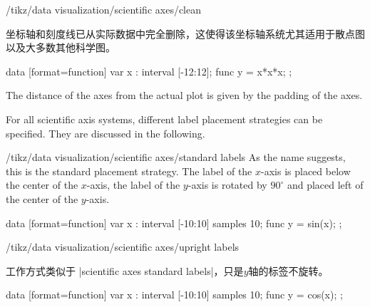 \begin{key}{/tikz/data visualization/scientific axes/clean}

    坐标轴和刻度线已从实际数据中完全删除，这使得该坐标轴系统尤其适用于散点图以及大多数其他科学图。
\begin{codeexample}[
    width=7.5cm,
    preamble={\usetikzlibrary{datavisualization.formats.functions}},
]
\tikz \datavisualization [
  scientific axes=clean,
  visualize as smooth line]
data [format=function] {
  var x : interval [-12:12];
  func y = \value x*\value x*\value x;
};
\end{codeexample}

    The distance of the axes from the actual plot is given by the padding of the axes.
\end{key}

For all scientific axis systems, different label placement strategies can be specified. They are discussed in the following.

\begin{key}{/tikz/data visualization/scientific axes/standard labels}
    As the name suggests, this is the standard placement strategy. The label of the $x$-axis is placed below the center of the $x$-axis, the label of the $y$-axis is rotated by $90^\circ$ and placed left of the center of the $y$-axis.
\begin{codeexample}[
    width=8cm,
    preamble={\usetikzlibrary{datavisualization.formats.functions}},
]
\tikz \datavisualization
 [scientific axes={clean, standard labels},
  visualize as smooth line,
  x axis={label=degree $d$,
    ticks={tick unit={}^\circ}},
  y axis={label=$\sin d$}]
data [format=function] {
  var x : interval [-10:10] samples 10;
  func y = sin(\value x);
};
\end{codeexample}
\end{key}

\begin{key}{/tikz/data visualization/scientific axes/upright labels}

    工作方式类似于 |scientific axes standard labels|，只是$y$轴的标签不旋转。
\begin{codeexample}[
    width=8cm,
    preamble={\usetikzlibrary{datavisualization.formats.functions}},
]
\tikz \datavisualization [
  scientific axes={clean, upright labels},
  visualize as smooth line,
  x axis={label=degree $d$,
    ticks={tick unit={}^\circ}},
  y axis={label=$\cos d$, include value=1,
    ticks={style={
        /pgf/number format/precision=4,
        /pgf/number format/fixed zerofill}}}]
data [format=function] {
  var x : interval [-10:10] samples 10;
  func y = cos(\value x);
};
\end{codeexample}
\end{key}

